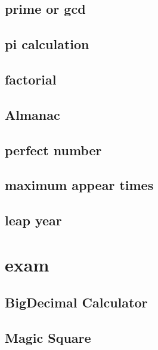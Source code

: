     \subsection{prime or gcd}
        
    \subsection{pi calculation}
        
    \subsection{factorial}
        
    \subsection{Almanac}
        
    \subsection{perfect number}
        
    \subsection{maximum appear times}
        
    \subsection{leap year}
        

\section{exam}
    \subsection{BigDecimal Calculator}
            
    \subsection{Magic Square}
        
